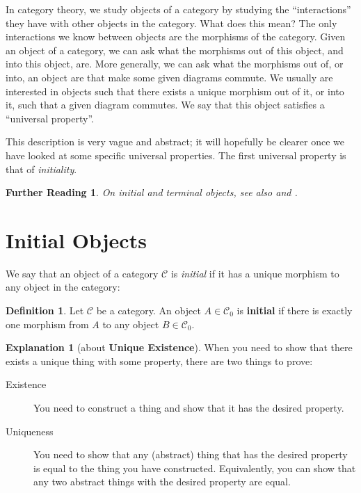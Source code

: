 \documentclass[a4paper,11pt, oneside,titlepage=false]{scrbook}
\theoremstyle{plain}
\newtheorem*{reading*}{Further Reading}
\theoremstyle{definition}
\newtheorem{dfn}[thm]{Definition}
\newtheorem{explanation}[thm]{Explanation}
\newcommand{\Cat}[1]{\mathcal{#1}}
\newcommand{\CC}{\Cat{C}}
\newcommand{\Ob}[1]{{#1}_0}
\begin{document}
In category theory, we study objects of a category by studying the ``interactions'' they have with other objects in the category.
What does this mean?
The only interactions we know between objects are the morphisms of the category.
Given an object of a category, we can ask what the morphisms out of this object, and into this object, are.
More generally, we can ask what the morphisms out of, or into, an object are that make some given diagrams commute.
We usually are interested in objects such that there exists a unique morphism out of it, or into it, such that a given diagram commutes.
We say that this object satisfies a ``universal property''.

This description is very vague and abstract; it will hopefully be clearer once we have looked at some specific universal properties.
The first universal property is that of \emph{initiality}.

\begin{reading*}
  On initial and terminal objects, see also \cite[\S 2.7.16]{barr-wells} and \cite[p. 48ff]{leinster}.
\end{reading*}

\section{Initial Objects}
\label{sec:initial-objects}

We say that an object of a category $\CC$ is \emph{initial} if it has a unique morphism to any object in the category:

\begin{dfn}
  Let $\CC$ be a category. An object $A \in \Ob{\CC}$ is \textbf{initial} if there is exactly one morphism from $A$ to any object $B \in \Ob{\CC}$.
\end{dfn}

\begin{explanation}[about \textbf{Unique Existence}]
  When you need to show that there exists a unique thing with some property, there are two things to prove:
  \begin{description}
  \item[Existence] You need to construct a thing and show that it has the desired property.
  \item[Uniqueness] You need to show that any (abstract) thing that has the desired property is equal to the thing you have constructed. Equivalently, you can show that any two abstract things with the desired property are equal.
  \end{description}
\end{explanation}
\end{document}
